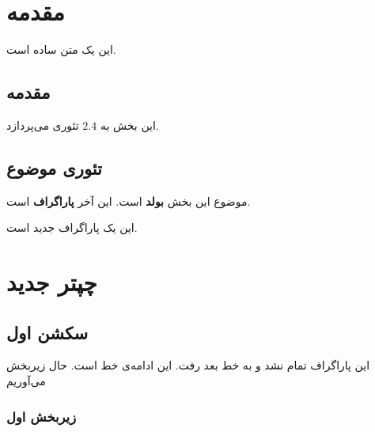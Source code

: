 \chapter{مقدمه}
این یک متن ساده است.
\section*{مقدمه}
این بخش به $2.4$ تئوری می‌پردازد.
\section{تئوری موضوع}
موضوع این بخش
\textbf{بولد} 
است.
این آخر \textbf{پاراگراف} است.

این یک پاراگراف جدید است.
\chapter{چپتر جدید}
\section{سکشن اول}
این پاراگراف تمام نشد و به خط بعد رفت.
این ادامه‌ی خط است. حال زیربخش می‌آوریم
\subsection{زیربخش اول}\label{zirbakhsh1}
